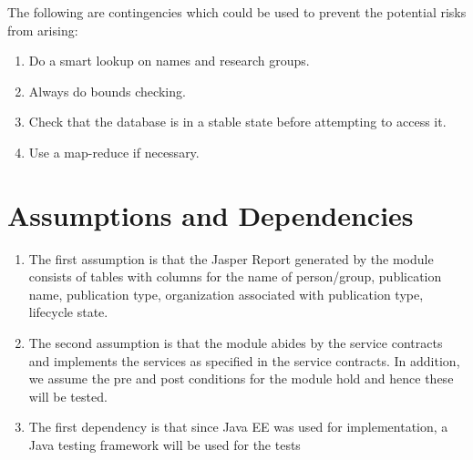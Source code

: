 	The following are contingencies which could be used to prevent the potential risks from arising:
\begin{enumerate}

	\item Do a smart lookup on names and research groups.
	\item Always do bounds checking.
	\item Check that the database is in a stable state before attempting to access it.
	\item Use a map-reduce if necessary.
         

\end{enumerate} 

\section{Assumptions and Dependencies}

\begin{enumerate}
	\item The first assumption is that the Jasper Report generated by the module consists of tables with columns for the name of person/group, publication name, publication type, organization associated with publication type, lifecycle state.
	\item The second assumption is that the module abides by the service contracts and implements the services as specified in the service contracts. In addition, we assume the pre and post conditions for the module hold and hence these will be tested.
	\item The first dependency is that since Java EE was used for implementation, a Java testing framework will be used for the tests
\end{enumerate}

\hypertarget{labelr}{}
